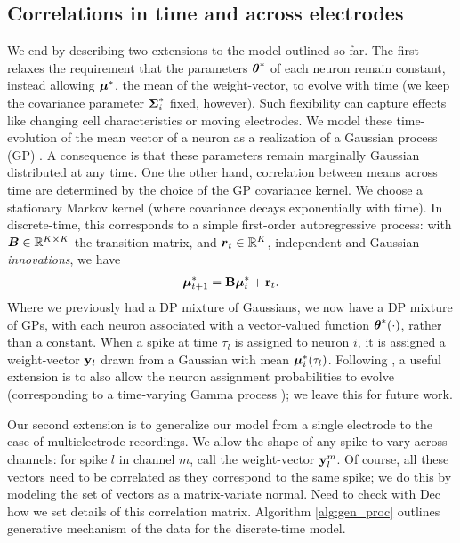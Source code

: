 \subsection{Correlations in time and across electrodes}
We end by describing two extensions to the model outlined so far. 
The first relaxes the requirement that the parameters $\boldsymbol{\theta}^*$ of each neuron remain constant, instead allowing $\boldsymbol{\mu}^*$, the mean of the weight-vector,
to evolve with time (we keep the covariance parameter $\boldsymbol{\Sigma}^*_i$ fixed, however). Such flexibility can capture effects like changing cell 
characteristics or moving electrodes.
We model these time-evolution of the mean vector of a neuron as a realization of a Gaussian process (GP) \citep{RasWil2006}. A consequence is that these 
parameters remain marginally Gaussian distributed at any time. One the other hand, correlation between means across time are determined by the choice 
of the GP covariance kernel.
We choose a stationary Markov kernel (where covariance decays exponentially with time). In discrete-time, this corresponds to a simple first-order 
autoregressive process: with $\boldsymbol{B} \in \mathbb{R}^{K \times K}$ the transition matrix, and $\boldsymbol{r}_t \in \mathbb{R}^K$, 
independent and Gaussian \emph{innovations}, we have
\begin{align}
  \boldsymbol{\mu}^*_{t+1} = \mathbf{B} \boldsymbol{\mu}^*_t + \mathbf{r}_t.
\end{align}
Where we previously had a DP mixture of Gaussians, we now have a DP mixture of GPs, with each neuron associated with a vector-valued function 
$\boldsymbol{\theta}^*(\cdot)$, rather than a constant. When a spike at time $\tau_l$ is assigned to neuron $i$, it is assigned a weight-vector $\mathbf{y}_l$ drawn from a 
Gaussian with mean $\boldsymbol{\mu}^*_i(\tau_l)$. Following \citep{wood2009}, a useful extension is to also allow the neuron assignment probabilities to evolve 
(corresponding to a time-varying Gamma process \citep{RaoTeh2009a}); we leave this for future work.

Our second extension is to generalize our model from a single electrode to the case of multielectrode recordings. 
We allow the shape of any spike to vary across channels: for spike $l$ in channel $m$, call the weight-vector $\mathbf{y}^m_l$.
Of course, all these vectors need to be correlated as they correspond to the same spike; we do this by modeling the set of
vectors as a matrix-variate normal. {\color{green} Need to check with Dec how we set details of this correlation matrix}.
Algorithm \ref{alg:gen_proc} outlines generative mechanism of the data for the discrete-time model.

